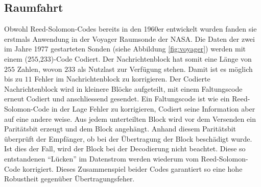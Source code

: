 \subsection{Raumfahrt}
Obwohl Reed-Solomon-Codes bereits in den 1960er entwickelt wurden fanden sie erstmals Anwendung in der Voyager Raumsonde der NASA. Die Daten der zwei im Jahre 1977 gestarteten Sonden (siehe Abbildung \ref{fig:voyager}) werden mit einem ($255$,$233$)-Code
Codiert. 
Der Nachrichtenblock hat somit eine Länge von $255$ Zahlen, wovon $233$ als Nutzlast zur Verfügung stehen.
Damit ist es möglich bis zu $11$ Fehler im Nachrichtenblock zu korrigieren. 
Der Codierte Nachrichtenblock wird in kleinere Blöcke aufgeteilt, mit einem Faltungscode erneut Codiert und anschliessend gesendet.
Ein Faltungscode ist wie ein Reed-Solomon-Code in der Lage Fehler zu korrigieren, 
Codiert seine Information aber auf eine andere weise. Aus jedem unterteilten Block wird vor dem Versenden ein Paritätsbit erzeugt und dem Block angehängt. Anhand diesem Paritätsbit überprüft der Empfänger, ob bei der Übertragung der Block beschädigt wurde. Ist dies der Fall, wird der Block bei der Decodierung nicht beachtet. Diese so entstandenen ``Lücken'' im Datenstrom werden wiederum vom Reed-Solomon-Code korrigiert. Dieses Zusammenspiel beider Codes garantiert so eine hohe Robustheit gegenüber Übertragungsfeher. 

% 
%
%
%
%
%
%
%

